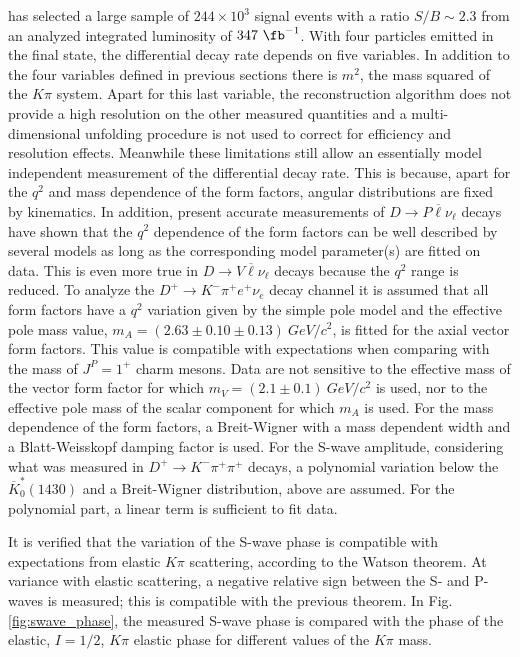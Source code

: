 \babar \cite{delAmoSanchez:2010fd} has selected a large sample of $244\times 10^3$ signal events with a ratio $S/B\sim 2.3$ from an analyzed integrated
luminosity of $347~\fb^{-1}$. With four particles emitted in the final state, 
the differential decay rate depends on five variables.
In addition to the four variables defined in previous sections there is 
$m^2$, the mass squared of the $K\pi$ system.
Apart for this last variable, the reconstruction algorithm does not provide 
a high resolution on the other measured quantities 
and a multi-dimensional unfolding procedure
is not used to correct for efficiency and resolution effects. Meanwhile these
limitations still allow an essentially model independent measurement of
the differential decay rate. This is because, apart for the $q^2$
and mass dependence of the form factors, angular distributions are fixed by
kinematics. In addition, present accurate measurements of 
$D \rightarrow P \overline{\ell}\nu_{\ell}$ decays have shown that the 
$q^2$ dependence of the form factors can be well described by several models
as long as the corresponding model parameter(s) are fitted on data.
This is even more true in $D \rightarrow V \overline{\ell}\nu_{\ell}$ decays
because the $q^2$ range is reduced. To analyze the
$D^+ \rightarrow K^- \pi^+ e^+ \nu_e$ decay channel it is assumed
that all form factors have a $q^2$ variation given by
the simple pole model and the effective pole mass value,
 $m_A=(2.63 \pm 0.10 \pm 0.13)~GeV/c^2$,
is fitted
for the axial vector form factors. This value is compatible
with expectations when comparing with the mass
of $J^P=1^+$ charm mesons. Data are not sensitive to the effective mass
of the vector form factor for which $m_V=(2.1 \pm 0.1)~GeV/c^2$ is used,
nor to the effective pole mass of the scalar component for which $m_A$ is used.
 For the mass dependence of the form factors,
a Breit-Wigner with a mass dependent width and a Blatt-Weisskopf damping factor
is used. For the S-wave amplitude, considering
what was measured in $D^+ \rightarrow K^- \pi^+\pi^+$ decays,
a polynomial variation below the $\overline{K}^*_0(1430)$
and a Breit-Wigner distribution, above are assumed. For the polynomial part, 
a linear term is sufficient to fit data.

It is verified that the variation of the S-wave phase is compatible 
with expectations from elastic $K\pi$ scattering, according
to the Watson theorem. At variance with elastic scattering, 
a negative relative sign between the S- and P-waves is measured; 
this is compatible with 
the previous theorem. In Fig. \ref{fig:swave_phase}, the measured
S-wave phase is compared with the phase of the elastic, $I=1/2$,
$K\pi$ elastic phase for different values of the $K\pi$ mass.

